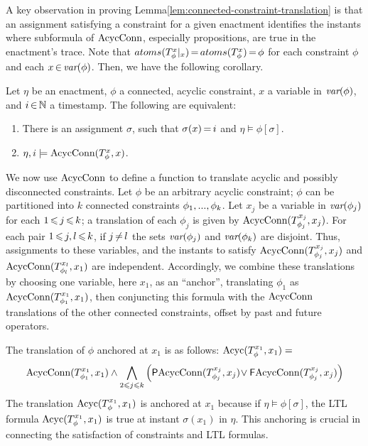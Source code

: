 A key observation in
proving Lemma\:\ref{lem:connected-constraint-translation}
is that
an assignment satisfying a constraint for a given enactment
identifies the instants where subformula of $\text{AcycConn}$,
especially propositions, are true in the enactment's trace.
Note that $atoms(T_\phi^x|_x)\,{=}\,atoms(T_\phi^x)\,{=}\,\phi$
for each constraint $\phi$ and each $x\,{\in}\,\textit{var}(\phi)$.
Then, we have the following corollary.
  
\begin{corollary}
  Let $\eta$ be an enactment,
  $\phi$ a connected, acyclic constraint,
  $x$ a variable in $\textit{var}(\phi)$,
  and $i\,{\in}\,\mathbb{N}$ a timestamp.
  The following are equivalent:
  \begin{enumerate}
  \item
    There is an assignment $\sigma$,
    such that
    $\sigma(x)\,{=}\,i$ and $\eta\models\phi[\sigma]$.
  \item
    $\eta,i\models \text{AcycConn}(T_\phi^x,x)$.
  \end{enumerate}
\end{corollary}

We now use $\text{AcycConn}$ to define a function
to translate
acyclic and possibly disconnected constraints.
Let $\phi$ be an arbitrary acyclic constraint;
$\phi$ can be partitioned into $k$ connected constraints
$\phi_1,...,\phi_{k}$.
Let $x_j$ be a variable in $\textit{var}(\phi_j)$
for each $1\,{\leqslant}\, j\,{\leqslant}\, k$;
a translation of each $\phi_j$ is given by
$\text{AcycConn}(T_{\phi_j}^{x_j},x_j)$.
For each pair $1\,{\leqslant}\, j, l\,{\leqslant}\, k$,
if $j\,{\neq}\, l$
the sets $\textit{var}(\phi_j)$ and $\textit{var}(\phi_k)$ are disjoint.
Thus, assignments to these variables,
and the instants to satisfy
$\text{AcycConn}(T_{\phi_j}^{x_j},x_j)$
and
$\text{AcycConn}(T_{\phi_l}^{x_l},x_1)$
are independent.
Accordingly, we combine these translations
by
choosing one variable, here $x_1$, as an ``anchor'',
translating $\phi_1$ as
$\text{AcycConn}(T_{\phi_1}^{x_1},x_1)$,
then conjuncting this formula
with the $\text{AcycConn}$ translations
of the other connected constraints,
offset by past and future operators.

The translation of $\phi$ anchored at $x_1$ is as follows: 
$\text{Acyc}(T_\phi^{x_1},x_1) =$
$$
\text{AcycConn}(T_{\phi_1}^{x_1},x_1) \land
\bigwedge_{2\leqslant j \leqslant k}
\left(\textsf{P}\text{AcycConn}(T_{\phi_j}^{x_j},x_j)\!\lor
  \textsf{F}\text{AcycConn}(T_{\phi_j}^{x_j},x_j)\right)
$$
The translation $\text{Acyc}(T_\phi^{x_1},x_1)$ is anchored
at $x_1$ because if 
$\eta\models\phi[\sigma]$,
the LTL formula
$\text{Acyc}(T_\phi^{x_1},x_1)$ is true at instant $\sigma(x_1)$
in $\eta$.
This anchoring is crucial in connecting
the satisfaction of constraints
and LTL formulas.

